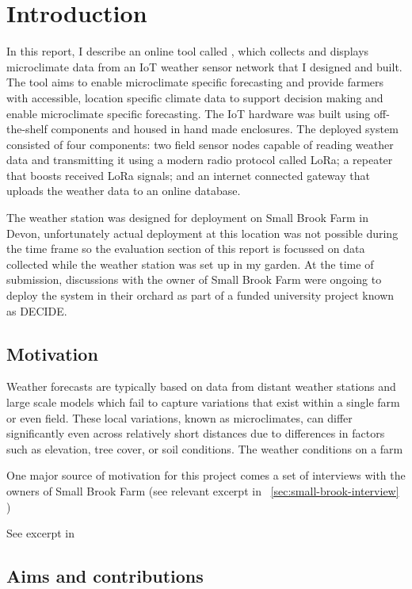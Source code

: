 \section{Introduction}

In this report, I describe an online tool called \myReportTitle{}, which
collects and displays microclimate data from an IoT weather sensor network that
I designed and built. The tool aims to enable microclimate specific forecasting
and provide farmers with accessible, location specific climate data to support
decision making and enable microclimate specific forecasting. The IoT hardware
was built using off-the-shelf components and housed in hand made enclosures. The
deployed system consisted of four components: two field sensor nodes capable of
reading weather data and transmitting it using a modern radio protocol called
LoRa; a repeater that boosts received LoRa signals; and an internet connected
gateway that uploads the weather data to an online database. 

The weather station was designed for deployment on Small Brook Farm in Devon,
unfortunately actual deployment at this location was not possible during the
time frame so the evaluation section of this report is focussed on data
collected while the weather station was set up in my garden. At the time of
submission, discussions with the owner of Small Brook Farm were ongoing to
deploy the system in their orchard as part of a funded university project known
as DECIDE.

\subsection{Motivation}

Weather forecasts are typically based on data from distant weather stations and
large scale models which fail to capture variations that exist within a single
farm or even field. These local variations, known as microclimates, can differ
significantly even across relatively short distances due to differences in
factors such as elevation, tree cover, or soil conditions. The weather
conditions on a farm 

One major source of motivation for this project comes a set of interviews with
the owners of Small Brook Farm (see relevant excerpt in
~\ref{sec:small-brook-interview} )

See excerpt in 



\subsection{Aims and contributions}

